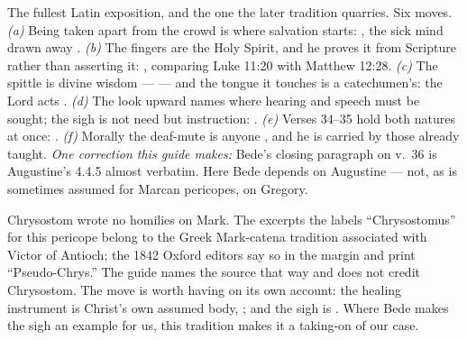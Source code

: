\begin{witnessnote}
The fullest Latin exposition, and the one the later tradition quarries. Six
moves. \textit{(a)} Being taken apart from the crowd is where salvation starts:
, the sick mind drawn away . \textit{(b)} The fingers are the Holy Spirit, and he proves it from
Scripture rather than asserting it: , comparing Luke 11:20 with
Matthew 12:28. \textit{(c)} The spittle is divine wisdom ---  --- and the tongue it touches is a
catechumen's: the Lord acts . \textit{(d)} The look upward names where hearing and
speech must be sought; the sigh is not need but instruction: . \textit{(e)} Verses 34--35 hold both natures at
once: . \textit{(f)} Morally the
deaf-mute is anyone , and he is carried by those already taught. \textit{One
correction this guide makes:} Bede's closing paragraph on v.~36 is Augustine's
 4.4.5 almost verbatim. Here Bede depends on
Augustine --- not, as is sometimes assumed for Marcan pericopes, on Gregory.
\end{witnessnote}

\begin{witnessnote}
Chrysostom wrote no homilies on Mark. The excerpts the  labels
``Chrysostomus'' for this pericope belong to the Greek Mark-catena tradition
associated with Victor of Antioch; the 1842 Oxford editors say so in the
margin and print ``Pseudo-Chrys.'' The guide names the source that way and does
not credit Chrysostom. The move is worth having on its own account: the healing
instrument is Christ's own assumed body, ; and the sigh is . Where Bede makes the sigh an example
for us, this tradition makes it a taking-on of our case.
\end{witnessnote}

